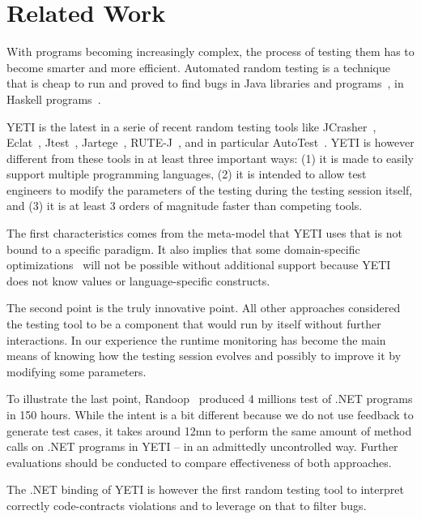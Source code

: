 \section{Related Work}\label{sec:rw}

With programs becoming increasingly complex, the process of testing 
them has to become smarter and more efficient. Automated random testing
is a technique that is cheap to run and proved to find bugs in Java libraries and 
programs~\cite{Pacheco2005,Csallner2004}, in Haskell 
programs~\cite{Claessen00quickcheck:a}.

YETI is the latest in a serie of recent random testing tools like
JCrasher~\cite{Csallner2004}, Eclat~\cite{Pacheco2005}, Jtest~\cite{Jtest},
Jartege~\cite{Oriat2004}, RUTE-J~\cite{Andrews2006a}, and in particular 
AutoTest~\cite{Ciupa2007,CLOM:08:AARTOO,CPLOM:08:PRTOOS}. 
YETI is however 
different from these tools in at least three important ways: (1) it is made to 
easily support multiple programming languages, (2) 
it is intended to allow test engineers to modify the parameters of the 
testing during the testing session itself, and (3) it is at least 3 orders 
of magnitude faster than competing tools. 

The first characteristics comes from
the meta-model that YETI uses that is not bound to a specific paradigm.
It also implies that some domain-specific optimizations~\cite{Pacheco2007,Godefroid2005,Chen2004a,Chen2005} will not be possible 
without additional support because YETI does not know values or language-specific
constructs. 

The second point is the truly innovative point. All other approaches
considered the testing tool to be a component that would run by itself without 
further interactions. In our experience the runtime monitoring has become 
the main means of knowing how the testing session evolves and possibly to 
improve it by modifying some parameters. 

To illustrate the last point, Randoop~\cite{1390643} produced 4 millions test of .NET 
programs in 150 hours. While the intent is a bit different because we do not use 
feedback to generate test cases, it takes around 12mn to perform the same amount of method 
calls on .NET programs in YETI -- in an admittedly uncontrolled way. Further 
evaluations should be conducted to compare effectiveness of both approaches.

The .NET binding of YETI is however the first random testing tool to interpret correctly 
code-contracts violations and to leverage on that to filter bugs.